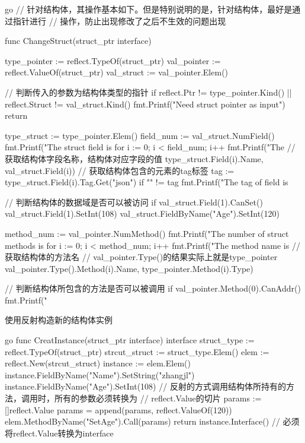 \begin{outline}[enumerate]
\begin{code-block}{go}
// 针对结构体，其操作基本如下。但是特别说明的是，针对结构体，最好是通过指针进行
// 操作，防止出现修改了之后不生效的问题出现

func ChangeStruct(struct_ptr interface{}) {
    type_pointer := reflect.TypeOf(struct_ptr)
    val_pointer := reflect.ValueOf(struct_ptr)
    val_struct := val_pointer.Elem()

    // 判断传入的参数为结构体类型的指针
    if reflect.Ptr != type_pointer.Kind() || reflect.Struct != val_struct.Kind() {
        fmt.Printf("Need struct pointer as input\n")
        return
    }

    type_struct := type_pointer.Elem()
    field_num := val_struct.NumField()
    fmt.Printf("The struct field is %
    for i := 0; i < field_num; i++ {
        fmt.Printf("The %
            // 获取结构体字段名称，结构体对应字段的值
            type_struct.Field(i).Name, val_struct.Field(i))
        // 获取结构体包含的元素的tag标签
        tag := type_struct.Field(i).Tag.Get("json")
        if "" != tag {
            fmt.Printf("The tag of field is %
        }
    }

    // 判断结构体的数据域是否可以被访问
    if val_struct.Field(1).CanSet() {
        val_struct.Field(1).SetInt(108)
        val_struct.FieldByName("Age").SetInt(120)
    }

    method_num := val_pointer.NumMethod()
    fmt.Printf("The number of struct methods is %
    for i := 0; i < method_num; i++ {
        fmt.Printf("The method name is %
            // 获取结构体的方法名
            // val_pointer.Type()的结果实际上就是type_pointer
            val_pointer.Type().Method(i).Name,
            type_pointer.Method(i).Type)
    }

    // 判断结构体所包含的方法是否可以被调用
    if val_pointer.Method(0).CanAddr() {
        fmt.Printf("%
    }
}
\end{code-block}

  \1 使用反射构造新的结构体实例

\begin{code-block}{go}
func CreatInstance(struct_ptr interface{}) interface{} {
    struct_type := reflect.TypeOf(struct_ptr)
    strcut_struct := struct_type.Elem()
    elem := reflect.New(strcut_struct)
    instance := elem.Elem()
    instance.FieldByName("Name").SetString("zhangjl")
    instance.FieldByName("Age").SetInt(108)
    // 反射的方式调用结构体所持有的方法，调用时，所有的参数必须转换为
    // reflect.Value的切片
    params := []reflect.Value{}
    params = append(params, reflect.ValueOf(120))
    elem.MethodByName("SetAge").Call(params)
    return instance.Interface() // 必须将reflect.Value转换为interface
}


\end{code-block}
\end{outline}
